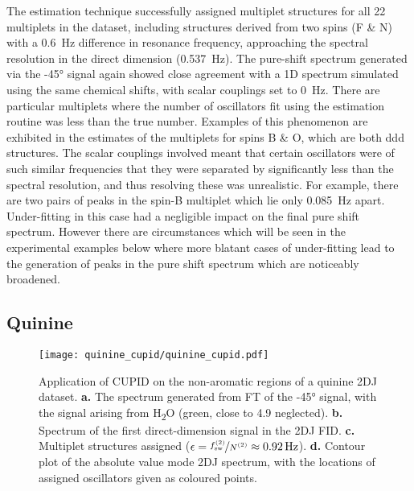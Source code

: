The estimation technique successfully assigned multiplet structures for all 22
multiplets in the dataset, including structures derived from two spins (F \& N)
with a \qty{0.6}{\hertz} difference in resonance frequency, approaching the
spectral resolution in the direct dimension (\qty{0.537}{\hertz}). The
pure-shift spectrum generated via the \ang{-45} signal again showed close
agreement with a 1D spectrum simulated using the same chemical shifts, with
scalar couplings set to \qty{0}{\hertz}. There are particular multiplets where
the number of oscillators fit using the estimation routine was less than the
true number. Examples of this phenomenon are exhibited in the estimates of the
multiplets for spins B \& O, which are both ddd structures. The scalar
couplings involved meant that certain oscillators were
of such similar frequencies that they were separated by significantly less than
the spectral resolution, and thus resolving these was unrealistic. For
example, there are two pairs of peaks in the spin-B multiplet which lie only
\qty{0.085}{\hertz} apart. Under-fitting in this case had a negligible impact
on the final pure shift spectrum. However there are circumstances which will be
seen in the experimental examples below where more blatant cases of under-fitting
lead to the generation of peaks in the pure shift spectrum which are noticeably
broadened.

\subsection{Quinine}
\begin{figure}
    \centering
    \texttt{[image: quinine\_cupid/quinine\_cupid.pdf]}
    \caption[
        Application of \acs{CUPID} on the non-aromatic regions of a quinine
        \acs{2DJ} dataset.
    ]{
        Application of \ac{CUPID} on the non-aromatic regions of a quinine
        \ac{2DJ} dataset.
        \textbf{a.} The spectrum generated from \ac{FT} of the \ang{-45}
        signal, with the signal arising from H\textsubscript{2}O (green, close
        to \qty{4.9}{\partspermillion} neglected).
        \textbf{b.} Spectrum of the first direct-dimension signal in the
        \ac{2DJ} \ac{FID}.
        \textbf{c.} Multiplet structures assigned ($\epsilon =
        \nicefrac{f_{\mathrm{sw}}^{(2)}}{N^{(2)}} \approx \qty{0.92}{\hertz}$).
        \textbf{d.} Contour plot of the absolute value mode \ac{2DJ} spectrum,
        with the locations of assigned oscillators given as coloured points.
    }
    \label{fig:quinine-cupid}
\end{figure}

